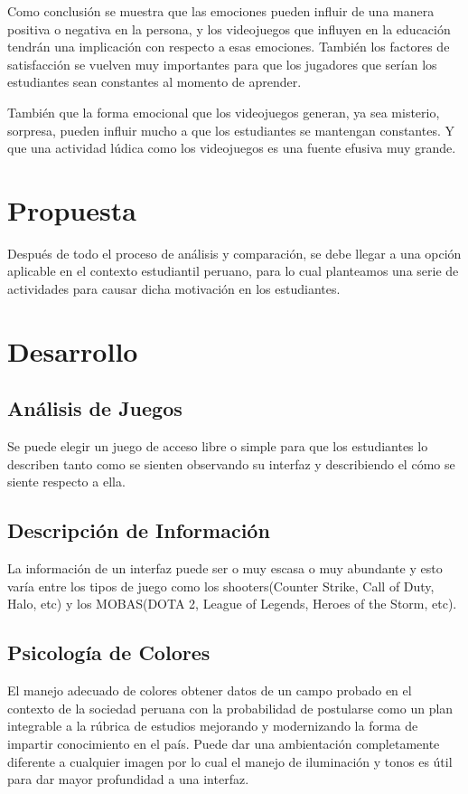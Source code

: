 \documentclass[conference, letterpaper]{IEEEtran}
\begin{document}
Como conclusión se muestra que las emociones pueden influir de una manera positiva o negativa en la persona, y los videojuegos que influyen en la educación tendrán una implicación con respecto a esas emociones. También los factores de satisfacción se vuelven muy importantes para que los jugadores que serían los estudiantes sean constantes al momento de aprender. 

También que la forma emocional que los videojuegos generan, ya sea misterio, sorpresa, pueden influir mucho a que los estudiantes se mantengan constantes. Y que una actividad lúdica como los videojuegos es una fuente efusiva muy grande.
\section{Propuesta}
Después de todo el proceso de análisis y comparación, se debe llegar a una opción aplicable en el contexto estudiantil peruano, para lo cual planteamos una serie de actividades para causar dicha motivación en los estudiantes.
\section{Desarrollo}
\subsection{Análisis de Juegos}
Se puede elegir un juego de acceso libre o simple para que los estudiantes lo describen tanto como se sienten observando su interfaz y describiendo el cómo se siente respecto a ella. 
\subsection{Descripción de Información}
La información de un interfaz puede ser o muy escasa o muy abundante y esto varía entre los tipos de juego como los shooters(Counter Strike, Call of Duty, Halo, etc) y los MOBAS(DOTA 2, League of Legends, Heroes of the Storm, etc).
\subsection{Psicología de Colores}
El manejo adecuado de colores obtener datos de un campo probado en el contexto de la sociedad peruana con la probabilidad de postularse como un plan integrable a la rúbrica de estudios mejorando y modernizando la forma de impartir conocimiento en el país. 
Puede dar una ambientación completamente diferente a cualquier imagen por lo cual el manejo de iluminación y tonos es útil para dar mayor profundidad a una interfaz. 
\end{document}
